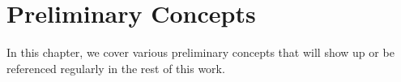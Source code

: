 \chapter{Preliminary Concepts}
\label{ch:prelims}

In this chapter, we cover various preliminary concepts that will show up or be referenced regularly in the rest of this work.
%

% 
%

%

%

%

%

%


\printbibliography[keyword={prelims},heading=subbibintoc,title=Chapter \thechapter~References]

